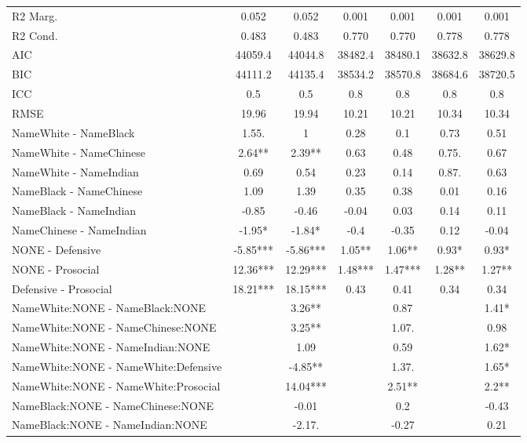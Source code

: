 \documentclass[]{report}
\begin{document}
\begin{table}
{\begin{tabular}[t]{lcccccc}
		R2 Marg. & \num{0.052} & \num{0.052} & \num{0.001} & \num{0.001} & \num{0.001} & \num{0.001}\\
		R2 Cond. & \num{0.483} & \num{0.483} & \num{0.770} & \num{0.770} & \num{0.778} & \num{0.778}\\
		AIC & \num{44059.4} & \num{44044.8} & \num{38482.4} & \num{38480.1} & \num{38632.8} & \num{38629.8}\\
		BIC & \num{44111.2} & \num{44135.4} & \num{38534.2} & \num{38570.8} & \num{38684.6} & \num{38720.5}\\
		ICC & \num{0.5} & \num{0.5} & \num{0.8} & \num{0.8} & \num{0.8} & \num{0.8}\\
		RMSE & \num{19.96} & \num{19.94} & \num{10.21} & \num{10.21} & \num{10.34} & \num{10.34}\\
	 \hline

	NameWhite - NameBlack & 1.55. & 1 & 0.28 & 0.1 & 0.73 & 0.51 \\ 
	NameWhite - NameChinese & 2.64** & 2.39** & 0.63 & 0.48 & 0.75. & 0.67 \\ 
	NameWhite - NameIndian & 0.69 & 0.54 & 0.23 & 0.14 & 0.87. & 0.63 \\ 
	NameBlack - NameChinese & 1.09 & 1.39 & 0.35 & 0.38 & 0.01 & 0.16 \\ 
	NameBlack - NameIndian & -0.85 & -0.46 & -0.04 & 0.03 & 0.14 & 0.11 \\ 
	NameChinese - NameIndian & -1.95* & -1.84* & -0.4 & -0.35 & 0.12 & -0.04 \\ 
	NONE - Defensive & -5.85*** & -5.86*** & 1.05** & 1.06** & 0.93* & 0.93* \\ 
	NONE - Prosocial & 12.36*** & 12.29*** & 1.48*** & 1.47*** & 1.28** & 1.27** \\ 
	Defensive - Prosocial & 18.21*** & 18.15*** & 0.43 & 0.41 & 0.34 & 0.34 \\ 
	NameWhite:NONE - NameBlack:NONE &  & 3.26** &  & 0.87 &  & 1.41* \\ 
	NameWhite:NONE - NameChinese:NONE &  & 3.25** &  & 1.07. &  & 0.98 \\ 
	NameWhite:NONE - NameIndian:NONE &  & 1.09 &  & 0.59 &  & 1.62* \\ 
	NameWhite:NONE - NameWhite:Defensive &  & -4.85** &  & 1.37. &  & 1.65* \\ 
	NameWhite:NONE - NameWhite:Prosocial &  & 14.04*** &  & 2.51** &  & 2.2** \\ 
	NameBlack:NONE - NameChinese:NONE &  & -0.01 &  & 0.2 &  & -0.43 \\ 
	NameBlack:NONE - NameIndian:NONE &  & -2.17. &  & -0.27 &  & 0.21 \\ 

\end{tabular}}
\end{table}
\end{document}
